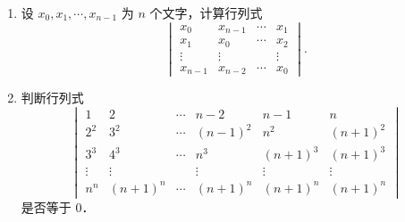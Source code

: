\begin{enumerate}
  （图 2.1 说明：正方形四个顶点按顺时针依次为 $X,Y,Z,U$，中心为 $E$ 且接地；各线段所标电阻（单位：$\Omega$）为 $R_{XY}=\dfrac12$，$R_{YZ}=\dfrac13$，$R_{ZU}=\dfrac14$，$R_{UX}=1$，$R_{XE}=\dfrac16$，$R_{YE}=\dfrac17$，$R_{UE}=\dfrac15$，$R_{ZE}=\dfrac18$．）%
  \anscompute
  \item 设 $x_0,x_1,\cdots,x_{n-1}$ 为 $n$ 个文字，计算行列式
  \[
    \begin{vmatrix}
      x_0&x_{n-1}&\cdots&x_1\\
      x_1&x_0&\cdots&x_2\\
      \vdots&\vdots&&\vdots\\
      x_{n-1}&x_{n-2}&\cdots&x_0
    \end{vmatrix}.
  \]
  \anscompute
  \item 判断行列式
  \[
    \begin{vmatrix}
      1&2&\cdots&n-2&n-1&n\\
      2^2&3^2&\cdots&(n-1)^2&n^2&(n+1)^2\\
      3^3&4^3&\cdots&n^3&(n+1)^3&(n+1)^3\\
      \vdots&\vdots&&\vdots&\vdots&\vdots\\
      n^n&(n+1)^n&\cdots&(n+1)^n&(n+1)^n&(n+1)^n
    \end{vmatrix}
  \]
  是否等于 $0$．
  \anscompute
\end{enumerate}
